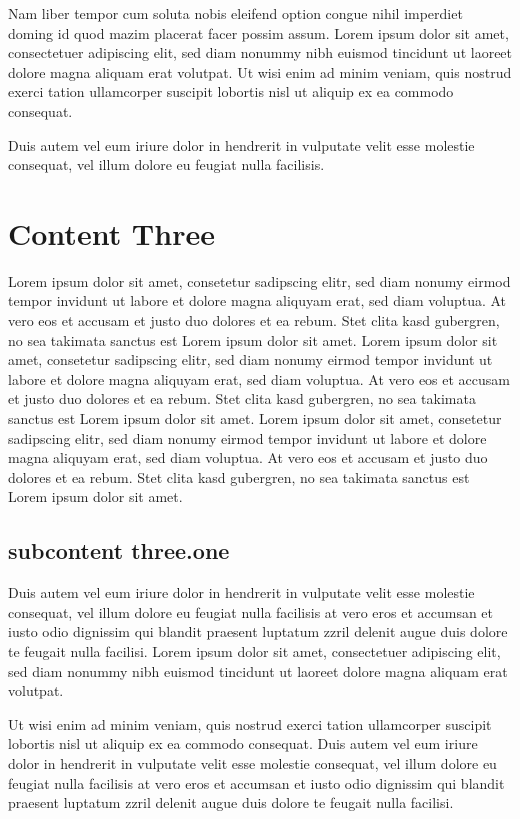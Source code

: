 Nam liber tempor cum soluta nobis eleifend option congue nihil imperdiet doming
id quod mazim placerat facer possim assum. Lorem ipsum dolor sit amet,
consectetuer adipiscing elit, sed diam nonummy nibh euismod tincidunt ut laoreet
dolore magna aliquam erat volutpat. Ut wisi enim ad minim veniam, quis nostrud
exerci tation ullamcorper suscipit lobortis nisl ut aliquip ex ea commodo
consequat.

Duis autem vel eum iriure dolor in hendrerit in vulputate velit esse molestie
consequat, vel illum dolore eu feugiat nulla facilisis.


\section{Content Three}
Lorem ipsum dolor sit amet, consetetur sadipscing elitr, sed diam nonumy eirmod
tempor invidunt ut labore et dolore magna aliquyam erat, sed diam voluptua. At
vero eos et accusam et justo duo dolores et ea rebum. Stet clita kasd gubergren,
no sea takimata sanctus est Lorem ipsum dolor sit amet. Lorem ipsum dolor sit
amet, consetetur sadipscing elitr, sed diam nonumy eirmod tempor invidunt ut
labore et dolore magna aliquyam erat, sed diam voluptua. At vero eos et accusam
et justo duo dolores et ea rebum. Stet clita kasd gubergren, no sea takimata
sanctus est Lorem ipsum dolor sit amet. Lorem ipsum dolor sit amet, consetetur
sadipscing elitr, sed diam nonumy eirmod tempor invidunt ut labore et dolore
magna aliquyam erat, sed diam voluptua. At vero eos et accusam et justo duo
dolores et ea rebum. Stet clita kasd gubergren, no sea takimata sanctus est
Lorem ipsum dolor sit amet.

 \subsection{subcontent three.one}   

Duis autem vel eum iriure dolor in hendrerit in vulputate velit esse molestie
consequat, vel illum dolore eu feugiat nulla facilisis at vero eros et accumsan
et iusto odio dignissim qui blandit praesent luptatum zzril delenit augue duis
dolore te feugait nulla facilisi. Lorem ipsum dolor sit amet, consectetuer
adipiscing elit, sed diam nonummy nibh euismod tincidunt ut laoreet dolore magna
aliquam erat volutpat.

Ut wisi enim ad minim veniam, quis nostrud exerci tation ullamcorper suscipit
lobortis nisl ut aliquip ex ea commodo consequat. Duis autem vel eum iriure
dolor in hendrerit in vulputate velit esse molestie consequat, vel illum dolore
eu feugiat nulla facilisis at vero eros et accumsan et iusto odio dignissim qui
blandit praesent luptatum zzril delenit augue duis dolore te feugait nulla
facilisi.


